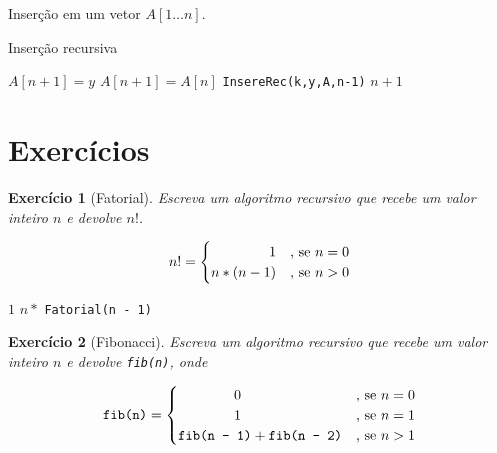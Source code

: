 \documentclass[a4paper]{memoir}
\newtheorem{eex}{Exerc\'icio}
\newcommand{\un}{1 \ldots n}
\begin{document}
\newpage 

\begin{ex}[Inserção]
Inserção em um vetor $A[\un]$.
\end{ex}

\begin{sol}

\begin{algorithm}
\caption*{Inserção recursiva}
\begin{algorithmic}[1]
    \State $A[n+1] = y$
  \Else
    \State $A[n+1] = A[n]$
  \EndIf
  \State \texttt{InsereRec(k,y,A,n-1)}
  \State \Return $n + 1$
\EndFunction
\end{algorithmic}
\end{algorithm}

\end{sol}

\section{Exercícios}

\begin{eex}[Fatorial]
Escreva um algoritmo recursivo que recebe um valor inteiro $n$ e devolve $n!$.

\begin{equation*}
  n! = 
  \begin{cases}
    \hfill 1 	& \mbox{, se } n = 0 \\
    \hfill n*(n - 1) 	& \mbox{, se } n > 0
  \end{cases}
\end{equation*}

\end{eex}

\begin{sol}

\begin{algorithmic}[1]
    \State \Return $1$
  \Else
    \State \Return $n * $ \texttt{Fatorial(n - 1)}
  \EndIf
\EndFunction
\end{algorithmic}

\end{sol}

\newpage 

\begin{eex}[Fibonacci]
Escreva um algoritmo recursivo que recebe um valor inteiro $n$ e devolve \texttt{fib(n)}, onde

\begin{equation*}
  \texttt{fib(n)} =
  \begin{cases}
     \qquad \qquad 0 	& \mbox{, se } n = 0 \\
     \qquad \qquad 1 	& \mbox{, se } n = 1 \\
    \hfill \texttt{fib(n - 1)} + \texttt{fib(n - 2)} 	& \mbox{, se } n > 1
  \end{cases}
\end{equation*}

\end{eex}
\end{document}
